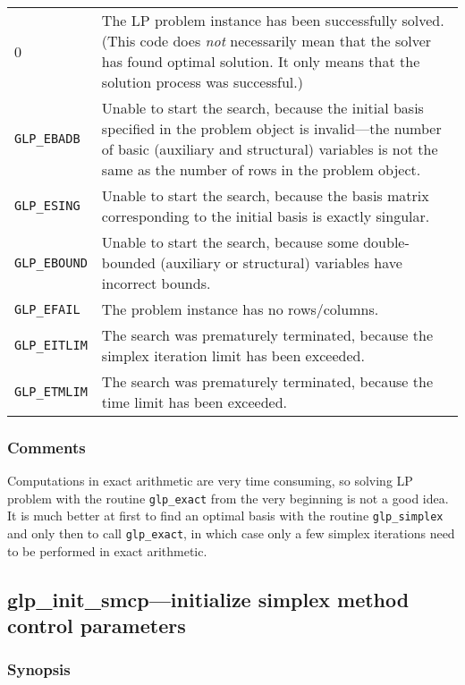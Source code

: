 \begin{tabular}{@{}p{25mm}p{97.3mm}@{}}
0 & The LP problem instance has been successfully solved. (This code
does {\it not} necessarily mean that the solver has found optimal
solution. It only means that the solution process was successful.) \\
\verb|GLP_EBADB| & Unable to start the search, because the initial basis
specified in the problem object is invalid---the number of basic
(auxiliary and structural) variables is not the same as the number of
rows in the problem object.\\
\verb|GLP_ESING| & Unable to start the search, because the basis matrix
corresponding to the initial basis is exactly singular.\\
\verb|GLP_EBOUND| & Unable to start the search, because some
double-bounded (auxiliary or structural) variables have incorrect
bounds.\\
\verb|GLP_EFAIL| & The problem instance has no rows/columns.\\
\verb|GLP_EITLIM| & The search was prematurely terminated, because the
simplex iteration limit has been exceeded.\\
\verb|GLP_ETMLIM| & The search was prematurely terminated, because the
time limit has been exceeded.\\
\end{tabular}

\subsubsection*{Comments}

Computations in exact arithmetic are very time consuming, so solving
LP problem with the routine \verb|glp_exact| from the very beginning is
not a good idea. It is much better at first to find an optimal basis
with the routine \verb|glp_simplex| and only then to call
\verb|glp_exact|, in which case only a few simplex iterations need to
be performed in exact arithmetic.


\subsection{glp\_init\_smcp---initialize simplex method control
parameters}

\subsubsection*{Synopsis}

